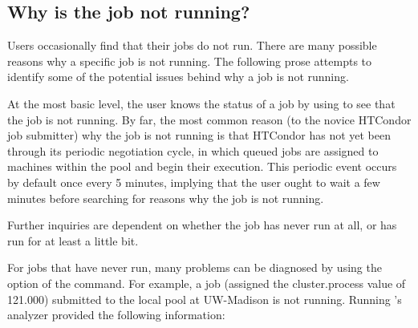 \subsection{\label{sec:job-not-running}Why is the job not running?}
Users occasionally find that their jobs do not run.
There are many possible reasons why a specific job is not running.
The following prose attempts to identify some of the potential issues
behind why a job is not running.

At the most basic level, the user knows the status of a job by
using  to see that the job is not running.
By far, the most common reason (to the novice HTCondor job submitter)
why the job is not running is that HTCondor has not yet 
been through its periodic negotiation cycle,
in which queued jobs are assigned to machines within the pool 
and begin their execution.
This periodic event occurs by default once every 5 minutes,
implying that the user ought to wait a few minutes before
searching for reasons why the job is not running.

Further inquiries are dependent on whether the job has 
never run at all, or has run for at least a little bit.

For jobs that have never run,
many problems can be diagnosed by using the 
option of the  command.
For example, a job (assigned the cluster.process value of
121.000) submitted to the local pool at UW-Madison
is not running.
Running 's analyzer provided the following information:

